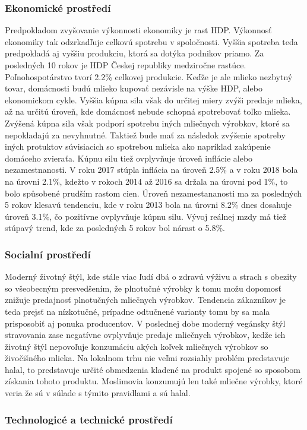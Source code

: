 \documentclass[12pt]{article}%
\begin{document}
\subsubsection*{Ekonomické prostředí}
Predpokladom zvyšovanie výkonnosti ekonomiky je rast HDP. Výkonnosť ekonomiky tak odzrkadľuje celkovú spotrebu v spoločnosti. Vyššia spotreba teda predpokladá aj vyššiu produkciu, ktorá sa dotýka podnikov priamo. Za posledných 10 rokov je HDP Českej republiky medziročne rastúce. Poľnohospotárstvo tvorí 2.2\% celkovej produkcie. Keďže je ale mlieko nezbytný tovar, domácnosti budú mlieko kupovať nezávisle na výške HDP, alebo ekonomickom cykle. Vyššia kúpna sila však do určitej miery zvýši predaje mlieka, až na určitú úroveň, kde domácnosť nebude schopná spotrebovať toľko mlieka. Zvýšená kúpna sila však podporí spotrebu iných mliečnych výrobkov, ktoré sa nepokladajú za nevyhnutné. Taktiež bude mať za následok zvýšenie spotreby iných protuktov súvisiacich so spotrebou mlieka ako napríklad zakúpenie domáceho zvieraťa. Kúpnu silu tiež ovplyvňuje úroveň inflácie alebo nezamestnanosti. V roku 2017 stúpla inflácia na úroveň 2.5\% a v roku 2018 bola na úrovni 2.1\%, kdežto v rokoch 2014 až 2016 sa držala na úrovni pod 1\%, to bolo spůsobené prudším rastom cien. Úroveň nezamestananosti ma za posledných 5 rokov klesavú tendenciu, kde v roku 2013 bola na úrovni 8.2\% dnes dosahuje úroveň  3.1\%, čo pozitívne ovplyvňuje kúpnu silu. Vývoj reálnej mzdy má tiež stúpavý trend, kde za posledných 5 rokov bol nárast o 5.8\%. 

\subsubsection*{Socialní prostředí}
Moderný životný štýl, kde stále viac ľudí dbá o zdravú výživu a strach s obezity so všeobecným presvedšením, že plnotučné výrobky k tomu možu dopomosť znižuje predajnosť plnotučných mliečnych výrobkov. Tendencia zákazníkov je teda prejsť na nízkotučné, prípadne odtučnené varianty tomu by sa mala prisposobiť aj ponuka producentov. 
V poslednej dobe moderný vegánsky štýl stravovania zase negatívne ovplyvňuje predaje mliečnych výrobkov, kedže ich životný štýl nepovoľuje konzumáciu akých koľvek mliečnych výrobkov so živočišného mlieka. Na lokalnom trhu nie veľmi rozsiahly problém predstavuje halal, to predstavuje určité obmedzenia kladené na produkt spojené so sposobom získania tohoto produktu. Moslimovia konzumujú len také mliečne výrobky, ktoré veria že sú v súlade s týmito pravidlami a sú halal. 
\subsubsection*{Technologicé a technické prostředí}
\end{document}
